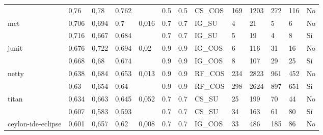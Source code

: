 \begin{table}[H]
{\begin{tabular}{lllllllllllll}
              & 0,76               & 0,78            & 0,762             &                    & 0.5           & 0.5        & CS\_COS                 & 169         & 1203        & 272         & 116         & No               \\
mct                            & 0,706              & 0,694           & 0,7               & 0,016              & 0.7           & 0.7        & IG\_SU                  & 4           & 21          & 5           & 6           & No               \\
                            & 0,716              & 0,667           & 0,684             &                    & 0.7           & 0.7        & IG\_SU                  & 5           & 19          & 4           & 8           & Sí                \\
junit                          & 0,676              & 0,722           & 0,694             & 0,02               & 0.9           & 0.9        & IG\_COS                 & 6           & 116         & 31          & 16          & No               \\
                          & 0,668              & 0,68            & 0,674             &                    & 0.9           & 0.9        & IG\_COS                 & 8           & 107         & 29          & 25          & Sí                \\
netty                          & 0,638              & 0,684           & 0,653             & 0,013              & 0.9           & 0.9        & RF\_COS                 & 234         & 2823        & 961         & 452         & No               \\
                          & 0,63               & 0,654           & 0,64              &                    & 0.9           & 0.9        & RF\_COS                 & 298         & 2624        & 897         & 651         & Sí                \\
titan                          & 0,634              & 0,663           & 0,645             & 0,052              & 0.7           & 0.7        & CS\_SU                  & 25          & 199         & 70          & 44          & No               \\
                          & 0,607              & 0,583           & 0,593             &                    & 0.7           & 0.7        & CS\_SU                  & 34          & 163         & 61          & 80          & Sí                \\
ceylon-ide-eclipse             & 0,601              & 0,657           & 0,62              & 0,008              & 0.7           & 0.7        & IG\_COS                 & 33          & 486         & 185         & 86          & No               \\

\end{tabular}}
\end{table}
